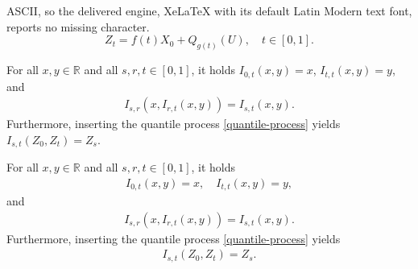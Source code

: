 \documentclass[10pt,a4paper]{amsart}
\begin{document}
ASCII, so the delivered engine, XeLaTeX with its default Latin Modern text font, reports no missing character.
\begin{equation}\label{quantile-process}
    Z_t = f(t) X_0 + Q_{g(t)}(U), \quad  t \in [0,1].
\end{equation}

\begin{proposition}\label{lem:consistent}
For all $ x, y \in \mathbb{R}$ and  all $s,r,t \in [0,1]$, it holds
   $I_{0,t}(x, y) = x$, $I_{t,t}(x, y) =  y$,
and 
\begin{align}
    I_{s,r}(x,  I_{r,t}(x,y)) 
    = I_{s,t}(x,y).
\end{align}
Furthermore, inserting the quantile process \eqref{quantile-process} yields
$I_{s,t}(Z_0, Z_t) = Z_s$.
\end{proposition}

\begin{proposition} \label{lem:consistent_A}
For all $ x, y \in \mathbb{R}$ and all $s,r,t \in [0,1]$, it holds
\begin{align}\label{cons-left-right}
   I_{0,t}(x, y) = x, \quad I_{t,t}(x, y) =  y,
\end{align}
and 
\begin{align}\label{cons-int-int}
    I_{s,r}(x,  I_{r,t}(x,y)) 
    = I_{s,t}(x,y) .
\end{align}
Furthermore, inserting the quantile process \eqref{quantile-process} yields
\begin{align}\label{interpolation2}
    I_{s,t}(Z_0, Z_t) = Z_s.
\end{align}
\end{proposition}
\end{document}
